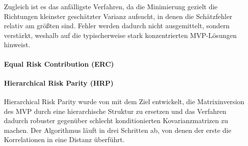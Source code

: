 \documentclass[12pt,a4paper]{article}
\begin{document}
Zugleich ist es das anfälligste Verfahren, da die Minimierung gezielt die Richtungen kleinster geschätzter Varianz aufsucht, in denen die Schätzfehler relativ am größten sind.
Fehler werden dadurch nicht ausgemittelt, sondern verstärkt, weshalb \textcite{lee2011} auf die typischerweise stark konzentrierten MVP-Lösungen hinweist.
\fi

\paragraph{Equal Risk Contribution (ERC)}

\paragraph{Hierarchical Risk Parity (HRP)}
\iffalse
Hierarchical Risk Parity wurde von \textcite{deprado2016} mit dem Ziel entwickelt, die Matrixinversion des MVP durch eine hierarchische Struktur zu ersetzen und das Verfahren dadurch robuster gegenüber schlecht konditionierten Kovarianzmatrizen zu machen.
Der Algorithmus läuft in drei Schritten ab, von denen der erste die Korrelationen in eine Distanz überführt.
\end{document}
